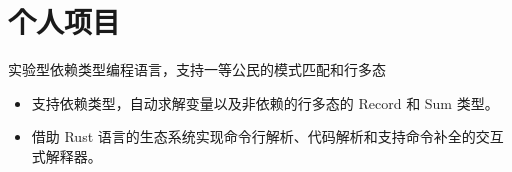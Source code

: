 \documentclass{resume}
\begin{document}
\section{个人项目}


实验型依赖类型编程语言，支持一等公民的模式匹配和行多态
\begin{itemize}
  \item 支持依赖类型，自动求解变量以及非依赖的行多态的 Record 和 Sum 类型。
  \item 借助 Rust 语言的生态系统实现命令行解析、代码解析和支持命令补全的交互式解释器。
\end{itemize}

\end{document}
